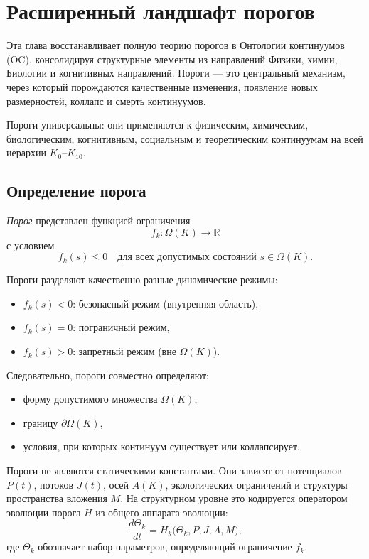 
\section{Расширенный ландшафт порогов}
\label{sec:thresholds-extended}

Эта глава восстанавливает полную теорию порогов в Онтологии континуумов (OC),
консолидируя структурные элементы из направлений Физики, химии,
Биологии и когнитивных направлений. Пороги — это центральный механизм, через который
порождаются качественные изменения, появление новых размерностей, коллапс и
смерть континуумов.

Пороги универсальны: они применяются к физическим, химическим, биологическим,
когнитивным, социальным и теоретическим континуумам на всей иерархии
\(K_0\)–\(K_{10}\).

\subsection{Определение порога}

\emph{Порог} представлен функцией ограничения
\[
   f_k : \Omega(K) \rightarrow \mathbb{R}
\]
с условием
\[
   f_k(s) \le 0
   \quad\text{для всех допустимых состояний } s\in\Omega(K).
\]

Пороги разделяют качественно разные динамические режимы:
\begin{itemize}
    \item \( f_k(s) < 0 \): безопасный режим (внутренняя область),
    \item \( f_k(s) = 0 \): пограничный режим,
    \item \( f_k(s) > 0 \): запретный режим (вне \(\Omega(K)\)).
\end{itemize}

Следовательно, пороги совместно определяют:
\begin{itemize}
    \item форму допустимого множества \(\Omega(K)\),
    \item границу \(\partial\Omega(K)\),
    \item условия, при которых континуум существует или коллапсирует.
\end{itemize}

Пороги не являются статическими константами.
Они зависят от потенциалов \(P(t)\), потоков \(J(t)\), осей \(A(K)\),
экологических ограничений и структуры пространства вложения \(M\).
На структурном уровне это кодируется оператором эволюции порога
\(H\) из общего аппарата эволюции:
\[
  \frac{d\Theta_k}{dt}
   = H_k\big(\Theta_k, P, J, A, M\big),
\]
где \(\Theta_k\) обозначает набор параметров, определяющий ограничение \(f_k\).


